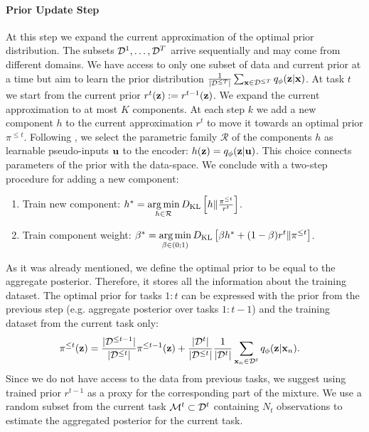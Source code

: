 \paragraph{Prior Update Step} At this step we expand the current approximation of the optimal prior distribution. The subsets $\mathcal{D}^1,\dots, \mathcal{D}^T$ arrive sequentially and may come from different domains. We have access to only one subset of data and current prior at a time but aim to learn the prior distribution $\tfrac{1}{|\mathcal{D}^{\leq T}|}\sum_{{\mathbf{x}}\in\mathcal{D}^{\leq T}}q_{\phi}({\mathbf{z}}|{\mathbf{x}})$. At task $t$ we start from the current prior $r^{t}({\mathbf{z}}):=r^{t-1}({\mathbf{z}})$. We expand the current approximation to at most $K$ components. At each step $k$ we add a new component $h$ to the current approximation $r^{t}$ to move it towards an optimal prior $\pi^{\leq t}$. Following \citep{tomczak2018vae}, we select the parametric family $\mathcal{R}$ of the components $h$ as learnable pseudo-inputs ${\mathbf{u}}$ to the encoder: $h({\mathbf{z}})=q_{\phi}({\mathbf{z}}|{\mathbf{u}})$. This choice connects parameters of the prior with the data-space. We conclude with a two-step procedure for adding a new component:
\begin{enumerate}
	\item Train new component:\newline
	$h^* = \operatorname*{arg\,min}\limits_{h\in\mathcal{R}} D_{\mathrm{KL}}\left[h\|\frac{\pi^{\leq t}}{r^{t}}\right]$.
	\item Train component weight:\newline
	$\beta^* = \operatorname*{arg\,min}\limits_{\beta\in(0;1)} D_{\mathrm{KL}}\left[\beta h^* + (1 - \beta) r^{t} \|\pi^{\leq t}\right]$.
	\end{enumerate}
As it was already mentioned, we define the optimal prior to be equal to the aggregate posterior. Therefore, it stores all the information about the training dataset. The optimal prior for tasks $1:t$ can be expressed with the prior from the previous step (e.g. aggregate posterior over tasks $1:t-1$) and the training dataset from the current task only: 
\begin{equation}
\begin{aligned}
& \pi^{\leq t}({\mathbf{z}}) = \frac{|\mathcal{D}^{\leq t-1}|}{|\mathcal{D}^{\leq t}|} \pi^{\leq t-1}({\mathbf{z}}) + \frac{|\mathcal{D}^{t}|}{|\mathcal{D}^{\leq t}|}\frac{1}{|\mathcal{D}^{t}|}\sum_{{\mathbf{x}}_n\in\mathcal{D}^{t}}q_{\phi}({\mathbf{z}}|{\mathbf{x}}_n).
\end{aligned}
\end{equation}
Since we do not have access to the data from previous tasks, we suggest using trained prior $r^{t-1}$ as a proxy for the corresponding part of the mixture. We use a random subset from the current task $\mathcal{M}^t \subset \mathcal{D}^t$ containing $N_{t}$ observations to estimate the aggregated posterior for the current task.
